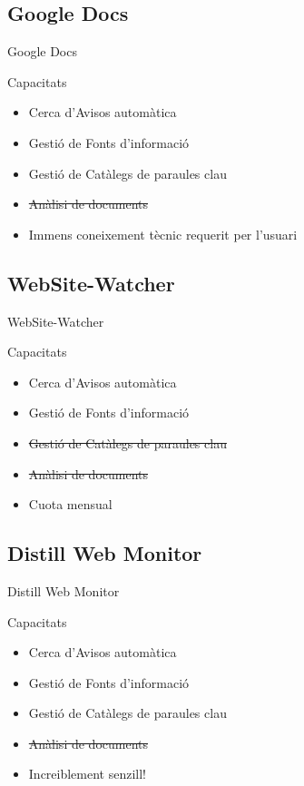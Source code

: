 \documentclass{beamer}
\begin{document}
\subsection{Google Docs}

\begin{frame}{Google Docs}
    \begin{block}{Capacitats}
        \begin{itemize}
            \item Cerca d'Avisos automàtica
            \item Gestió de Fonts d'informació
            \item Gestió de Catàlegs de paraules clau
            \item \sout{Anàlisi de documents}
            \item Immens coneixement tècnic requerit per l'usuari
        \end{itemize}
    \end{block}
\end{frame}


\subsection{WebSite-Watcher}

\begin{frame}{WebSite-Watcher}
    \begin{block}{Capacitats}
        \begin{itemize}
            \item Cerca d'Avisos automàtica
            \item Gestió de Fonts d'informació
            \item \sout{Gestió de Catàlegs de paraules clau}
            \item \sout{Anàlisi de documents}
            \item Cuota mensual
        \end{itemize}
    \end{block}
\end{frame}


\subsection{Distill Web Monitor}

\begin{frame}{Distill Web Monitor}
    \begin{block}{Capacitats}
        \begin{itemize}
            \item Cerca d'Avisos automàtica
            \item Gestió de Fonts d'informació
            \item Gestió de Catàlegs de paraules clau
            \item \sout{Anàlisi de documents}
            \item Increiblement senzill!
        \end{itemize}
    \end{block}
\end{frame}
\end{document}
